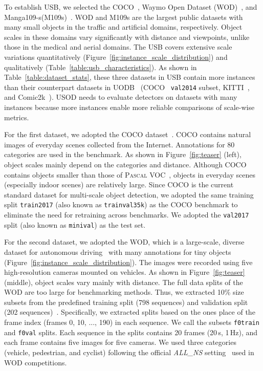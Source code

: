 \documentclass[10pt,twocolumn,letterpaper]{article}
\newcommand{\Hz}{\,Hz\xspace}
\newcommand{\Pascal}{\textsc{Pascal}\xspace}
\newcommand{\Mangas}{Manga109-s\xspace}
\newcommand{\MangasAbbr}{M109s\xspace}
\begin{document}
To establish USB, we selected the COCO~\cite{COCO_ECCV2014}, Waymo Open Dataset (WOD)~\cite{WaymoOpenDataset_CVPR2020}, and \Mangas (\MangasAbbr)~\cite{Manga109_Matsui_MTAP2017, Manga109_Aizawa_IEEEMM2020}.
WOD and \MangasAbbr are the largest public datasets with many small objects in the traffic and artificial domains, respectively.
Object scales in these domains vary significantly with distance and viewpoints, unlike those in the medical and aerial domains.
The USB covers extensive scale variations quantitatively (Figure~\ref{fig:instance_scale_distribution}) and qualitatively (Table~\ref{table:usb_characteristics}).
As shown in Table~\ref{table:dataset_stats},
these three datasets in USB contain more instances
than their counterpart datasets in UODB~\cite{UniversalObjectDetection_CVPR2019}
(COCO~\cite{COCO_ECCV2014} \texttt{val2014} subset, KITTI~\cite{KITTI_CVPR2012}, and Comic2k~\cite{CrossDomainDetection_Inoue_CVPR2018}).
USOD needs to evaluate detectors on datasets with many instances
because more instances enable more reliable comparisons of scale-wise metrics.


For the first dataset, we adopted the COCO dataset~\cite{COCO_ECCV2014}.
COCO contains natural images of everyday scenes collected from the Internet.
Annotations for 80 categories are used in the benchmark.
As shown in Figure~\ref{fig:teaser} (left),
object scales mainly depend on the categories and distance.
Although COCO contains objects smaller than those of \Pascal VOC~\cite{PASCALVOC_IJCV2015},
objects in everyday scenes (especially indoor scenes) are relatively large.
Since COCO is the current standard dataset for multi-scale object detection,
we adopted the same training split \texttt{train2017} (also known as \texttt{trainval35k}) as the COCO benchmark
to eliminate the need for retraining across benchmarks.
We adopted the \texttt{val2017} split (also known as \texttt{minival}) as the test set.


For the second dataset, we adopted the WOD,
which is a large-scale, diverse dataset for autonomous driving~\cite{WaymoOpenDataset_CVPR2020}
with many annotations for tiny objects (Figure~\ref{fig:instance_scale_distribution}).
The images were recorded using five high-resolution cameras mounted on vehicles.
As shown in Figure~\ref{fig:teaser} (middle), object scales vary mainly with distance.
The full data splits of the WOD are too large for benchmarking methods.
Thus, we extracted 10\% size subsets from the predefined training split (798 sequences) and validation split (202 sequences)~\cite{WaymoOpenDataset_CVPR2020}.
Specifically,
we extracted splits based on the ones place of the frame index (frames 0, 10, ..., 190) in each sequence.
We call the subsets \texttt{f0train} and \texttt{f0val} splits.
Each sequence in the splits contains 20 frames (20\,s, 1\Hz),
and each frame contains five images for five cameras.
We used three categories (vehicle, pedestrian, and cyclist) following the official \textit{ALL\_NS} setting~\cite{WaymoOpenDataset_2D_detection_leaderboard} used in WOD competitions.
\end{document}
